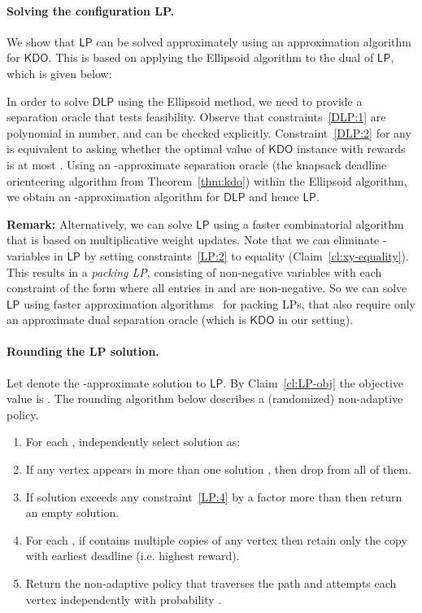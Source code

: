 \documentclass[11pt,letterpaper]{article}
\numberwithin{algorithm}{section}
\newcommand{\kdo}{\ensuremath{\mathsf{KDO}}\xspace}
\newcommand{\lp}{\ensuremath{\mathsf{LP}}\xspace}
\newcommand{\dlp}{\ensuremath{\mathsf{DLP}}\xspace}
\begin{document}
\paragraph{Solving the configuration LP.} We show that \lp  can be solved approximately using an approximation algorithm for \kdo. This is based on applying the Ellipsoid algorithm to the dual of \lp, which is given below:

In order to solve \dlp using the Ellipsoid method, we need to provide a separation oracle that tests feasibility. Observe that constraints~\eqref{DLP:1} are polynomial in number, and can be checked explicitly. Constraint~\eqref{DLP:2} for any  is equivalent to asking whether the optimal value of \kdo instance  with rewards  is at most . Using an -approximate separation oracle (the knapsack deadline orienteering algorithm from Theorem~\ref{thm:kdo}) within the Ellipsoid algorithm, we obtain an -approximation algorithm for \dlp and hence \lp.

{\bf Remark:} Alternatively, we can solve \lp using a faster combinatorial algorithm that is based on multiplicative weight updates. Note that we can eliminate -variables in \lp by setting constraints~\eqref{LP:2} to equality (Claim~\ref{cl:xy-equality}). This results in a {\em packing LP}, consisting of  non-negative variables with each constraint of the form  where all entries in  and  are non-negative. So we can solve \lp using faster approximation algorithms~\cite{PST91,GK07} for packing LPs, that also require only an approximate dual separation oracle (which is \kdo in our setting).


\paragraph{Rounding the LP solution.} Let  denote the -approximate solution to \lp. By Claim~\ref{cl:LP-obj} the objective value is . The rounding algorithm below describes a (randomized) non-adaptive policy.
\begin{enumerate}
\item \label{step:corr1} For each , independently select solution  as:



\item \label{step:corr2} If any vertex  appears in more than one solution , then drop  from all of them.

\item \label{step:corr3} If solution  exceeds any constraint~\eqref{LP:4} by a factor more than  then return an empty solution.

\item \label{step:corr4} For each , if  contains multiple copies of any vertex  then retain only the copy with earliest deadline (i.e. highest reward).

\item \label{step:corr5} Return the non-adaptive policy that traverses the path   and attempts each vertex independently with probability .
\end{enumerate}
\end{document}
